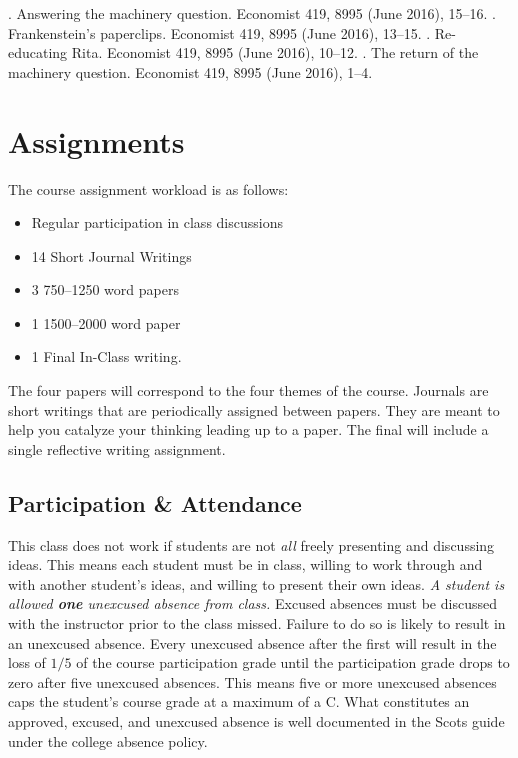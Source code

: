 \documentclass[nobib]{tufte-handout}
\begin{document}
\newline \vspace{.15in}
. Answering the machinery question. Economist 419, 8995 (June 2016), 15--16.
\newline \vspace{.15in}
. Frankenstein's paperclips. Economist 419, 8995 (June 2016), 13--15.
\newline \vspace{.15in}
. Re-educating Rita. Economist 419, 8995 (June 2016), 10--12.
\newline \vspace{.15in}
. The return of the machinery question. Economist 419, 8995 (June 2016), 1--4.


\section{Assignments}

The course assignment workload is as follows:
\begin{itemize}
\item Regular participation in class discussions
\item 14 Short Journal Writings
\item 3 750--1250 word papers
\item 1 1500--2000 word paper
\item 1 Final In-Class writing.
\end{itemize}
The four papers will correspond to the four themes of the course. Journals are short writings that are periodically assigned between papers. They are meant to help you catalyze your thinking leading up to a paper. The final will include a single reflective writing assignment.

\subsection{Participation \& Attendance}

This class does not work if students are not \textit{all} freely presenting and discussing ideas.  This means each student must be in class, willing to work through and with another student's ideas, and willing to present their own ideas.  \textit{A student is allowed \textbf{one} unexcused absence from class.} Excused absences must be discussed with the instructor prior to the class missed.  Failure to do so is likely to result in an unexcused absence.  Every unexcused absence after the first will result in the loss of \(1/5\) of the course participation grade until the participation grade drops to zero after five unexcused absences. This means five or more unexcused absences caps the student's course grade at a maximum of a C. What constitutes an approved, excused, and unexcused absence is well documented in the Scots guide under the college absence policy.
\end{document}
